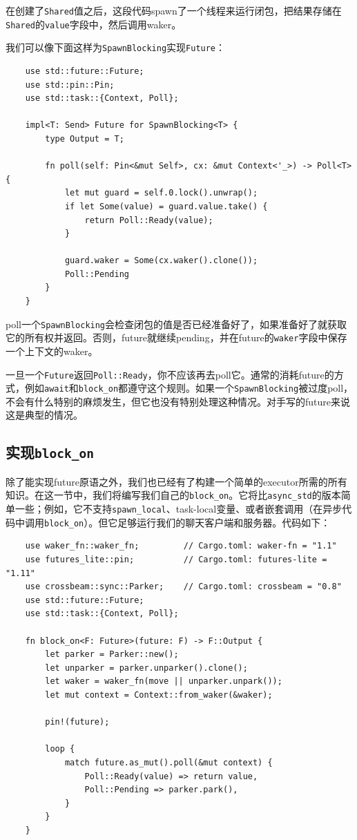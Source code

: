 在创建了\texttt{Shared}值之后，这段代码spawn了一个线程来运行闭包，把结果存储在\texttt{Shared}的\texttt{value}字段中，然后调用waker。

我们可以像下面这样为\texttt{SpawnBlocking}实现\texttt{Future}：
\begin{verbatim}
    use std::future::Future;
    use std::pin::Pin;
    use std::task::{Context, Poll};

    impl<T: Send> Future for SpawnBlocking<T> {
        type Output = T;

        fn poll(self: Pin<&mut Self>, cx: &mut Context<'_>) -> Poll<T> {
            let mut guard = self.0.lock().unwrap();
            if let Some(value) = guard.value.take() {
                return Poll::Ready(value);
            }

            guard.waker = Some(cx.waker().clone());
            Poll::Pending
        }
    }
\end{verbatim}

poll一个\texttt{SpawnBlocking}会检查闭包的值是否已经准备好了，如果准备好了就获取它的所有权并返回。否则，future就继续pending，并在future的\texttt{waker}字段中保存一个上下文的waker。

一旦一个\texttt{Future}返回\texttt{Poll::Ready}，你不应该再去poll它。通常的消耗future的方式，例如\texttt{await}和\texttt{block\_on}都遵守这个规则。如果一个\texttt{SpawnBlocking}被过度poll，不会有什么特别的麻烦发生，但它也没有特别处理这种情况。对手写的future来说这是典型的情况。

\subsection{实现\texttt{block\_on}}
除了能实现future原语之外，我们也已经有了构建一个简单的executor所需的所有知识。在这一节中，我们将编写我们自己的\texttt{block\_on}。它将比\texttt{async\_std}的版本简单一些；例如，它不支持\texttt{spawn\_local}、task-local变量、或者嵌套调用（在异步代码中调用\texttt{block\_on}）。但它足够运行我们的聊天客户端和服务器。代码如下：
\begin{verbatim}
    use waker_fn::waker_fn;         // Cargo.toml: waker-fn = "1.1"
    use futures_lite::pin;          // Cargo.toml: futures-lite = "1.11"
    use crossbeam::sync::Parker;    // Cargo.toml: crossbeam = "0.8"
    use std::future::Future;
    use std::task::{Context, Poll};

    fn block_on<F: Future>(future: F) -> F::Output {
        let parker = Parker::new();
        let unparker = parker.unparker().clone();
        let waker = waker_fn(move || unparker.unpark());
        let mut context = Context::from_waker(&waker);

        pin!(future);

        loop {
            match future.as_mut().poll(&mut context) {
                Poll::Ready(value) => return value,
                Poll::Pending => parker.park(),
            }
        }
    }
\end{verbatim}

